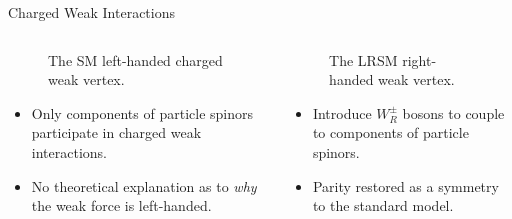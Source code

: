 \documentclass[aspectratio=169]{beamer}
\begin{document}
\begin{frame}{Charged Weak Interactions}
  \begin{columns}
    \begin{column}{0.5\textwidth}
      \begin{figure}
        \centering
        
        \caption{The SM left-handed charged weak vertex.}
      \end{figure}
      \begin{itemize}
        \item Only  components of 
          particle spinors participate in charged weak interactions.
        \item No theoretical explanation as to \emph{why} 
          the weak force is left-handed.
      \end{itemize}
    \end{column}
    \begin{column}{0.5\textwidth}
      \begin{figure}
        \centering
        
        \caption{The LRSM right-handed weak vertex.}
      \end{figure}
      \begin{itemize}
        \item Introduce $W_{R}^{\pm}$ bosons to couple to  components of 
        particle spinors.
        \item Parity restored as a symmetry to the standard model.
      \end{itemize}
    \end{column}
  \end{columns}
\end{frame}
\end{document}
